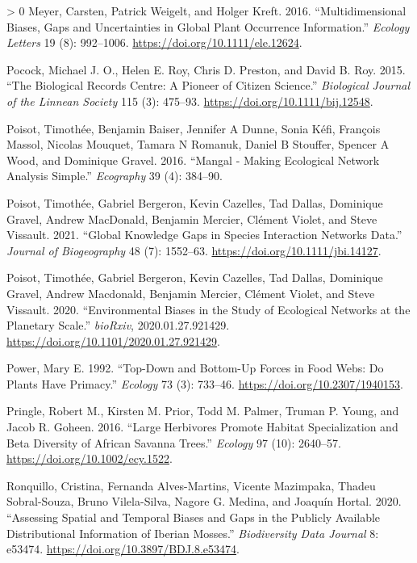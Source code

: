 \documentclass[11pt]{article}
\newlength{\cslhangindent}
\newenvironment{CSLReferences}[3] %
 {%
  \setlength{\parindent}{0pt}
  \ifodd #1 \everypar{\setlength{\hangindent}{\cslhangindent}}\ignorespaces\fi
  \ifnum #2 > 0
  \setlength{\parskip}{#2\baselineskip}
  \fi
 }%
 {}
\begin{document}
\begin{CSLReferences}{1}{0}
\leavevmode\hypertarget{ref-Meyer2016MulBia}{}%
Meyer, Carsten, Patrick Weigelt, and Holger Kreft. 2016.
{``Multidimensional Biases, Gaps and Uncertainties in Global Plant
Occurrence Information.''} \emph{Ecology Letters} 19 (8): 992--1006.
\url{https://doi.org/10.1111/ele.12624}.

\leavevmode\hypertarget{ref-Pocock2015BioRec}{}%
Pocock, Michael J. O., Helen E. Roy, Chris D. Preston, and David B. Roy.
2015. {``The Biological Records Centre: A Pioneer of Citizen Science.''}
\emph{Biological Journal of the Linnean Society} 115 (3): 475--93.
\url{https://doi.org/10.1111/bij.12548}.

\leavevmode\hypertarget{ref-Poisot2016ManMak}{}%
Poisot, Timothée, Benjamin Baiser, Jennifer A Dunne, Sonia Kéfi,
François Massol, Nicolas Mouquet, Tamara N Romanuk, Daniel B Stouffer,
Spencer A Wood, and Dominique Gravel. 2016. {``Mangal - Making
Ecological Network Analysis Simple.''} \emph{Ecography} 39 (4): 384--90.

\leavevmode\hypertarget{ref-Poisot2021GloKno}{}%
Poisot, Timothée, Gabriel Bergeron, Kevin Cazelles, Tad Dallas,
Dominique Gravel, Andrew MacDonald, Benjamin Mercier, Clément Violet,
and Steve Vissault. 2021. {``Global Knowledge Gaps in Species
Interaction Networks Data.''} \emph{Journal of Biogeography} 48 (7):
1552--63. \url{https://doi.org/10.1111/jbi.14127}.

\leavevmode\hypertarget{ref-Poisot2020EnvBia}{}%
Poisot, Timothée, Gabriel Bergeron, Kevin Cazelles, Tad Dallas,
Dominique Gravel, Andrew Macdonald, Benjamin Mercier, Clément Violet,
and Steve Vissault. 2020. {``Environmental Biases in the Study of
Ecological Networks at the Planetary Scale.''} \emph{bioRxiv},
2020.01.27.921429. \url{https://doi.org/10.1101/2020.01.27.921429}.

\leavevmode\hypertarget{ref-Power1992TopBot}{}%
Power, Mary E. 1992. {``Top-Down and Bottom-Up Forces in Food Webs: Do
Plants Have Primacy.''} \emph{Ecology} 73 (3): 733--46.
\url{https://doi.org/10.2307/1940153}.

\leavevmode\hypertarget{ref-Pringle2016LarHer}{}%
Pringle, Robert M., Kirsten M. Prior, Todd M. Palmer, Truman P. Young,
and Jacob R. Goheen. 2016. {``Large Herbivores Promote Habitat
Specialization and Beta Diversity of African Savanna Trees.''}
\emph{Ecology} 97 (10): 2640--57.
\url{https://doi.org/10.1002/ecy.1522}.

\leavevmode\hypertarget{ref-Ronquillo2020AssSpa}{}%
Ronquillo, Cristina, Fernanda Alves-Martins, Vicente Mazimpaka, Thadeu
Sobral-Souza, Bruno Vilela-Silva, Nagore G. Medina, and Joaquín Hortal.
2020. {``Assessing Spatial and Temporal Biases and Gaps in the Publicly
Available Distributional Information of Iberian Mosses.''}
\emph{Biodiversity Data Journal} 8: e53474.
\url{https://doi.org/10.3897/BDJ.8.e53474}.


\end{CSLReferences}
\end{document}
